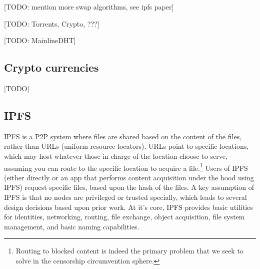 \documentclass[12pt]{report}
\begin{document}
[TODO: mention more swap algorithms, see ipfs paper]

[TODO: Torrents, Crypto, ???]

[TODO: MainlineDHT]

\subsection{Crypto currencies}

[TODO]

\subsection{IPFS}

IPFS is a P2P system where files are shared based on the content of the files, rather than URLs (uniform resource locators). URLs point to specific locations, which may host whatever those in charge of the location choose to serve, assuming you can route to the specific location to acquire a file.\footnote{Routing to blocked content is indeed the primary problem that we seek to solve in the censorship circumvention sphere.} Users of IPFS (either directly or an app that performs content acquisition under the hood using IPFS) request specific files, based upon the hash of the files. A key assumption of IPFS is that no nodes are privileged or trusted specially, which leads to several design decisions based upon prior work. At it's core, IPFS provides basic utilities for identities, networking, routing, file exchange, object acquisition, file system management, and basic naming capabilities.\cite{ipfs}
\end{document}
